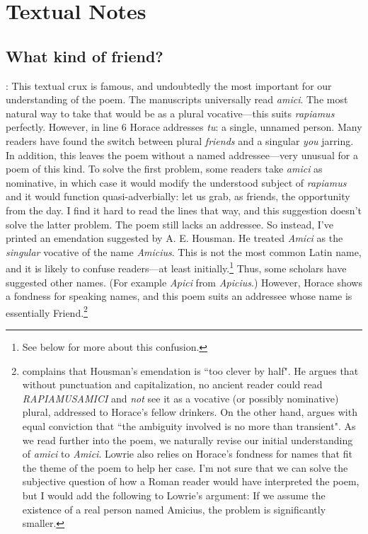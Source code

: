 \chapter*{Textual Notes}

\section*{What kind of friend?}


: This textual crux is famous, and undoubtedly the most important for our understanding of the poem.  The manuscripts universally read \textit{amici}.  The most natural way to take that would be as a plural vocative---this suits \textit{rapiamus} perfectly.  However, in line 6 Horace addresses \textit{tu}: a single, unnamed person.  Many readers have found the switch between plural \textit{friends} and a singular \textit{you} jarring.  In addition, this leaves the poem without a named addressee---very unusual for a poem of this kind.  To solve the first problem, some readers take \textit{amici} as nominative, in which case it would modify the understood subject of \textit{rapiamus} and it would function quasi-adverbially: let us grab, as friends, the opportunity from the day.  I find it hard to read the lines that way, and this suggestion doesn't solve the latter problem.  The poem still lacks an addressee.  So instead, I've printed an emendation suggested by A. E. Housman.  He treated \textit{Amici} as the \textit{singular} vocative of the name \textit{Amicius}.  This is not the most common Latin name, and it is likely to confuse readers---at least initially.\footnote{See below for more about this confusion.}  Thus, some scholars have suggested other names.  (For example \textit{Apici} from \textit{Apicius}.)  However, Horace shows a fondness for speaking names, and this poem suits an addressee whose name is essentially Friend.\footnote{\citet[205]{gaskin2013} complains that Housman's emendation is ``too clever by half".  He argues that without punctuation and capitalization, no ancient reader could read \textit{RAPIAMUSAMICI} and \textit{not} see it as a vocative (or possibly nominative) plural, addressed to Horace's fellow drinkers.  On the other hand, \citet[417, note 14]{lowrie1992} argues with equal conviction that ``the ambiguity involved is no more than transient".  As we read further into the poem, we naturally revise our initial understanding of \textit{amici} to \textit{Amici}.  Lowrie also relies on Horace's fondness for names that fit the theme of the poem to help her case.  I'm not sure that we can solve the subjective question of how a Roman reader would have interpreted the poem, but I would add the following to Lowrie's argument: If we assume the existence of a real person named Amicius, the problem is significantly smaller.}

